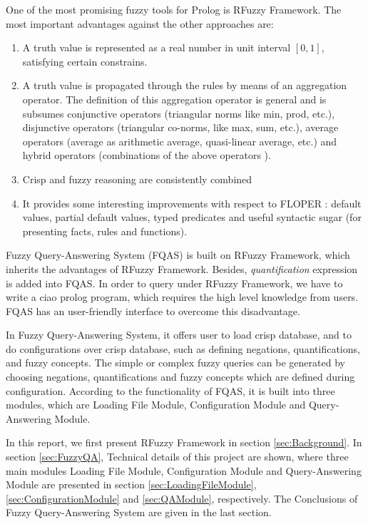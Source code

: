 \documentclass[main.tex]{subfiles}
\begin{document}
One of the most promising fuzzy tools for Prolog is RFuzzy Framework. The most important advantages against the other approaches are:
\begin{enumerate}
\item A truth value is represented as a real number in unit interval $[0,1]$, satisfying certain constrains. 
\item A truth value is propagated through the rules by means of an aggregation operator. The definition of this aggregation operator is general and is subsumes conjunctive operators (triangular norms \cite{KPMRPE00} like min, prod, etc.), disjunctive operators \cite{TCC95} (triangular co-norms, like max, sum, etc.),
average operators (average as arithmetic average, quasi-linear average, etc.) and hybrid operators (combinations of the above operators \cite{PTC02}). 
\item Crisp and fuzzy reasoning are consistently combined
\item It provides some interesting improvements with respect to FLOPER \cite{MM08a,Mor06}: default values, partial default values, typed predicates and useful syntactic sugar (for presenting facts, rules and functions).
\end{enumerate}

Fuzzy Query-Answering System (FQAS) is built on RFuzzy Framework, which inherits the advantages of RFuzzy Framework. Besides, \textit{quantification} expression is added into FQAS.
In order to query under RFuzzy Framework, we have to write a ciao prolog program, which requires the high level knowledge from users. FQAS has an user-friendly interface to overcome this disadvantage.

In Fuzzy Query-Answering System, it offers user to load crisp database, and to do configurations over crisp database, such as defining negations, quantifications, and fuzzy concepts. The simple or complex fuzzy queries can be generated by choosing negations, quantifications and fuzzy concepts which are defined during configuration. According to the functionality of FQAS, it is built into three modules, which are Loading File Module, Configuration Module and Query-Answering Module.

In this report, we first present RFuzzy Framework in section \ref{sec:Background}. In section \ref{sec:FuzzyQA}, Technical details of this project are shown, where three main modules Loading File Module, Configuration Module and Query-Answering Module are presented  in section \ref{sec:LoadingFileModule}, \ref{sec:ConfigurationModule} and \ref{sec:QAModule}, respectively. The Conclusions of Fuzzy Query-Answering System are given in the last section.
\end{document}
